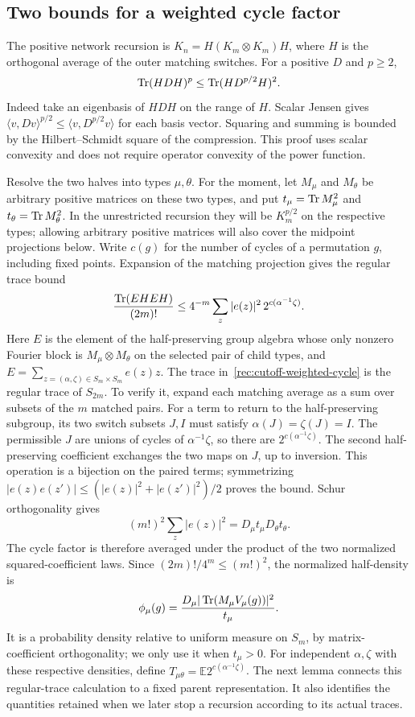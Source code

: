 \subsection{Two bounds for a weighted cycle factor}

The positive network recursion is $K_n=H(K_m\otimes K_m)H$,
where $H$ is the orthogonal average of the outer matching switches.
For a positive $D$ and $p\ge2$,
\begin{equation}\label{rec:cutoff-compressed-jensen}
 \operatorname{Tr}(HDH)^p\le\operatorname{Tr}(HD^{p/2}H)^2.
\end{equation}
Indeed take an eigenbasis of $HDH$ on the range of $H$.
Scalar Jensen gives $\langle v,Dv\rangle^{p/2}
\le\langle v,D^{p/2}v\rangle$ for each basis vector.  Squaring and
summing is bounded by the Hilbert--Schmidt square of the compression.
This proof uses scalar convexity and does not require operator
convexity of the power function.

Resolve the two halves into types $\mu,\theta$.  For the moment,
let $M_\mu$ and $M_\theta$ be arbitrary positive matrices on these
two types, and put $t_\mu=\operatorname{Tr} M_\mu^2$ and
$t_\theta=\operatorname{Tr} M_\theta^2$.  In the unrestricted recursion they
will be $K_m^{p/2}$ on the respective types; allowing arbitrary positive
matrices will also cover the midpoint projections below.
Write $c(g)$ for the number of cycles of a permutation $g$, including
fixed points.  Expansion of the matching projection gives the regular trace bound
\begin{equation}\label{rec:cutoff-weighted-cycle}
 \frac{\operatorname{Tr}(EHEH)}{(2m)!}
 \le4^{-m}\sum_z|e(z)|^2\,2^{c(\alpha^{-1}\zeta)}.
\end{equation}
Here $E$ is the element of the half-preserving group algebra whose only
nonzero Fourier block is $M_\mu\otimes M_\theta$ on the selected
pair of child types, and
$E=\sum_{z=(\alpha,\zeta)\in S_m\times S_m}e(z)z$.
The trace in~\eqref{rec:cutoff-weighted-cycle} is the regular trace
of $S_{2m}$.  To verify it, expand each matching average as a sum over
subsets of the $m$ matched pairs.  For a term to return to the
half-preserving subgroup, its two switch subsets $J,I$ must satisfy
$\alpha(J)=\zeta(J)=I$.  The permissible $J$ are unions of cycles
of $\alpha^{-1}\zeta$, so there are $2^{c(\alpha^{-1}\zeta)}$.
The second half-preserving coefficient exchanges the two maps on $J$,
up to inversion.  This operation is a bijection on the paired terms;
symmetrizing $|e(z)e(z')|\le(|e(z)|^2+|e(z')|^2)/2$ proves the bound.
Schur orthogonality gives
\[
 (m!)^2\sum_z|e(z)|^2=D_\mu t_\mu D_\theta t_\theta.
\]
The cycle factor is therefore averaged under the product of the two
normalized squared-coefficient laws.
Since $(2m)!/4^m\le(m!)^2$, the normalized half-density is
\[
 \phi_\mu(g)=
 \frac{D_\mu|\operatorname{Tr}(M_\mu V_\mu(g))|^2}{t_\mu}.
\]
It is a probability density relative to uniform measure on $S_m$,
by matrix-coefficient orthogonality; we only use it when $t_\mu>0$.
For independent $\alpha,\zeta$ with these respective densities, define
$T_{\mu\theta}=\mathbb E2^{c(\alpha^{-1}\zeta)}$.
The next lemma connects this regular-trace calculation to a fixed parent
representation.  It also identifies the quantities retained when we
later stop a recursion according to its actual traces.


